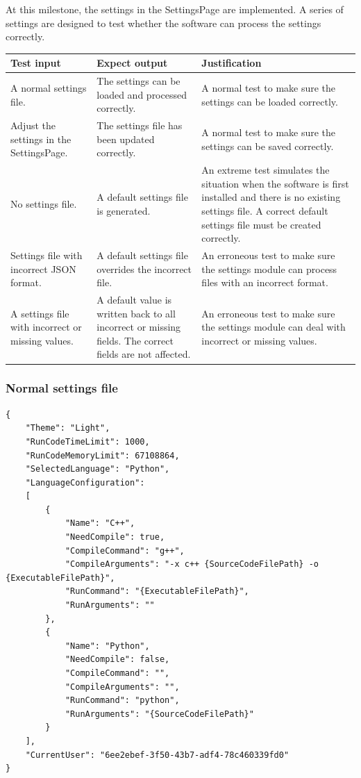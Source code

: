 \documentclass[a4paper]{report}
\begin{document}
At this milestone, the settings in the SettingsPage are implemented. A series of settings are designed to test whether the software can process the settings correctly.

\begin{tabulary}{\textwidth}{|L|L|L|}
    \hline
    Test input & Expect output & Justification \\
    \hline
    A normal settings file. & The settings can be loaded and processed correctly. & A normal test to make sure the settings can be loaded correctly. \\ 
    \hline
    Adjust the settings in the SettingsPage. & The settings file has been updated correctly. & A normal test to make sure the settings can be saved correctly. \\
    \hline
    No settings file. & A default settings file is generated. & An extreme test simulates the situation when the software is first installed and there is no existing settings file. A correct default settings file must be created correctly. \\
    \hline
    Settings file with incorrect JSON format. & A default settings file overrides the incorrect file. & An erroneous test to make sure the settings module can process files with an incorrect format. \\
    \hline
    A settings file with incorrect or missing values. & A default value is written back to all incorrect or missing fields. The correct fields are not affected. & An erroneous test to make sure the settings module can deal with incorrect or missing values. \\
    \hline
\end{tabulary}

\subsubsection{Normal settings file}

\begin{verbatim}
{
    "Theme": "Light",
    "RunCodeTimeLimit": 1000,
    "RunCodeMemoryLimit": 67108864,
    "SelectedLanguage": "Python",
    "LanguageConfiguration": 
    [
        {
            "Name": "C++",
            "NeedCompile": true,
            "CompileCommand": "g++",
            "CompileArguments": "-x c++ {SourceCodeFilePath} -o {ExecutableFilePath}",
            "RunCommand": "{ExecutableFilePath}",
            "RunArguments": ""
        },
        {
            "Name": "Python",
            "NeedCompile": false,
            "CompileCommand": "",
            "CompileArguments": "",
            "RunCommand": "python",
            "RunArguments": "{SourceCodeFilePath}"
        }
    ],
    "CurrentUser": "6ee2ebef-3f50-43b7-adf4-78c460339fd0"
}
\end{verbatim}
\end{document}
